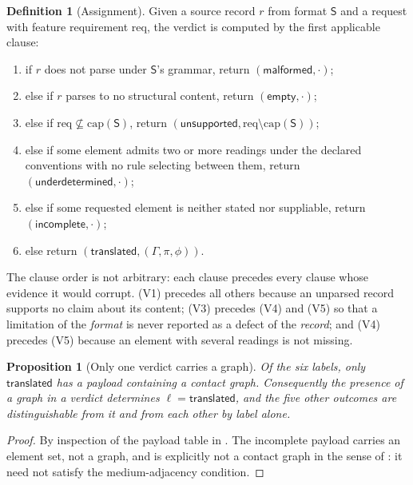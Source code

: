 \documentclass[11pt,twocolumn,a4paper]{article}
\theoremstyle{msthm}
\newtheorem{proposition}[theorem]{Proposition}
\theoremstyle{definition}
\newtheorem{definition}[theorem]{Definition}
\theoremstyle{remark}
\newcommand{\Gph}{\Gamma}
\newcommand{\Prov}{\pi}
\newcommand{\Src}{\mathsf{S}}
\newcommand{\Capset}{\mathrm{cap}}
\newcommand{\Req}{\mathrm{req}}
\begin{document}
\begin{definition}[Assignment]
\label{def:assign}
Given a source record $r$ from format $\Src$ and a request with feature
requirement $\Req$, the verdict is computed by the first applicable
clause:
\begin{enumerate}[label=(V\arabic*),leftmargin=*]
\item if $r$ does not parse under $\Src$'s grammar, return
$(\textsf{malformed},\cdot)$;
\item else if $r$ parses to no structural content, return
$(\textsf{empty},\cdot)$;
\item else if $\Req\not\subseteq\Capset(\Src)$, return
$(\textsf{unsupported},\Req\setminus\Capset(\Src))$;
\item else if some element admits two or more readings under the
declared conventions with no rule selecting between them, return
$(\textsf{underdetermined},\cdot)$;
\item else if some requested element is neither stated nor suppliable,
return $(\textsf{incomplete},\cdot)$;
\item else return $(\textsf{translated},(\Gph,\Prov,\phi))$.
\end{enumerate}
\end{definition}

The clause order is not arbitrary: each clause precedes every clause
whose evidence it would corrupt. (V1) precedes all others because an
unparsed record supports no claim about its content; (V3) precedes (V4)
and (V5) so that a limitation of the \emph{format} is never reported as
a defect of the \emph{record}; and (V4) precedes (V5) because an element
with several readings is not missing.

\begin{proposition}[Only one verdict carries a graph]
\label{prop:one-graph}
Of the six labels, only $\textsf{translated}$ has a payload containing a
contact graph. Consequently the presence of a graph in a verdict
determines $\ell=\textsf{translated}$, and the five other outcomes are
distinguishable from it and from each other by label alone.
\end{proposition}

\begin{proof}
By inspection of the payload table in . The
\textsf{incomplete} payload carries an element set, not a graph, and is
explicitly not a contact graph in the sense of : it
need not satisfy the medium-adjacency condition.
\end{proof}
\end{document}
